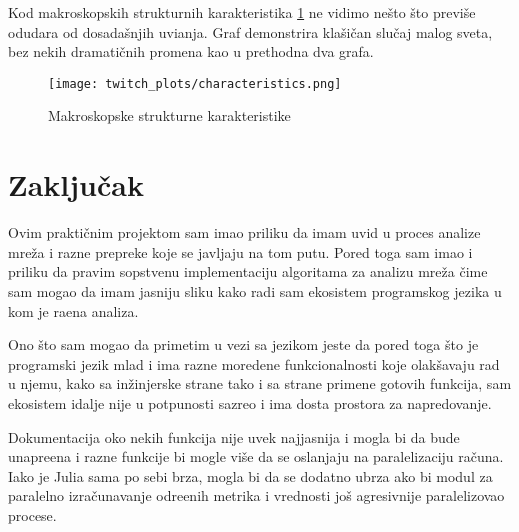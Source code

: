 \documentclass[11pt,a4paper]{article}
\begin{document}
Kod makroskopskih strukturnih karakteristika \ref{fig:twitch-karakteristike} ne vidimo ne\v sto \v sto previ\v se odudara od dosada\v snjih uvi\dj anja. Graf demonstrira kla\v si\v can slu\v caj malog sveta, bez nekih dramati\v cnih promena kao u prethodna dva grafa.

\begin{figure}
    \centering
    \texttt{[image: twitch\_plots/characteristics.png]}
    \caption{Makroskopske strukturne karakteristike}
    \label{fig:twitch-karakteristike}
\end{figure}

\newpage

\section{Zaklju\v cak}

Ovim prakti\v cnim projektom sam imao priliku da imam uvid u proces analize mre\v za i razne prepreke koje se javljaju na tom putu. Pored toga sam imao i priliku da pravim sopstvenu implementaciju algoritama za analizu mre\v za \v cime sam mogao da imam jasniju sliku kako radi sam ekosistem programskog jezika u kom je ra\dj ena analiza.

Ono \v sto sam mogao da primetim u vezi sa jezikom jeste da pored toga \v sto je programski jezik mlad i ima razne moredene funkcionalnosti koje olak\v savaju rad u njemu, kako sa in\v zinjerske strane tako i sa strane primene gotovih funkcija, sam ekosistem idalje nije u potpunosti sazreo i ima dosta prostora za napredovanje.

Dokumentacija oko nekih funkcija nije uvek najjasnija i mogla bi da bude unapre\dj ena i razne funkcije bi mogle vi\v se da se oslanjaju na paralelizaciju ra\v cuna. Iako je Julia sama po sebi brza, mogla bi da se dodatno ubrza ako bi modul za paralelno izra\v cunavanje odre\dj enih metrika i vrednosti jo\v s agresivnije paralelizovao procese.

\newpage
\end{document}
